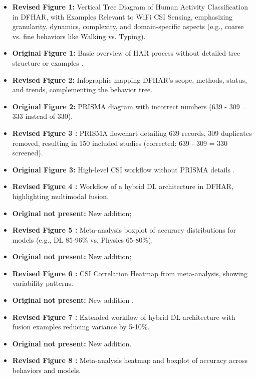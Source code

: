 \documentclass[Afour,sageh,times]{sagej}
\begin{document}
\begin{itemize}  
    \item \textbf{Revised Figure 1:} Vertical Tree Diagram of Human Activity Classification in DFHAR, with Examples Relevant to WiFi CSI Sensing, emphasizing granularity, dynamics, complexity, and domain-specific aspects (e.g., coarse vs. fine behaviors like Walking vs. Typing).  
    \item \textbf{Original Figure 1:} Basic overview of HAR process without detailed tree structure or examples .\\
    \item \textbf{Revised Figure 2:} Infographic mapping DFHAR’s scope, methods, status, and trends, complementing the behavior tree.  
    \item \textbf{Original Figure 2:} PRISMA diagram with incorrect numbers (639 - 309 = 333 instead of 330). \\
    \item \textbf{Revised Figure 3 :} PRISMA flowchart detailing 639 records, 309 duplicates removed, resulting in 150 included studies (corrected: 639 - 309 = 330 screened).  
    \item \textbf{Original Figure 3:} High-level CSI workflow without PRISMA details .\\
    \item \textbf{Revised Figure 4 :} Workflow of a hybrid DL architecture in DFHAR, highlighting multimodal fusion.  
    \item \textbf{Original not present:} New addition;\\
    \item \textbf{Revised Figure 5 :} Meta-analysis boxplot of accuracy distributions for models (e.g., DL 85-96\% vs. Physics 65-80\%).  
    \item \textbf{Original not present:} New addition;  \\
    \item \textbf{Revised Figure 6 :} CSI Correlation Heatmap from meta-analysis, showing variability patterns.  
    \item \textbf{Original not present:} New addition . \\ 
    \item \textbf{Revised Figure 7 :} Extended workflow of hybrid DL architecture with fusion examples reducing variance by 5-10\%.  
    \item \textbf{Original not present:} New addition. \\
    \item \textbf{Revised Figure 8 :} Meta-analysis heatmap and boxplot of accuracy across behaviors and models.  

\end{itemize}
\end{document}
